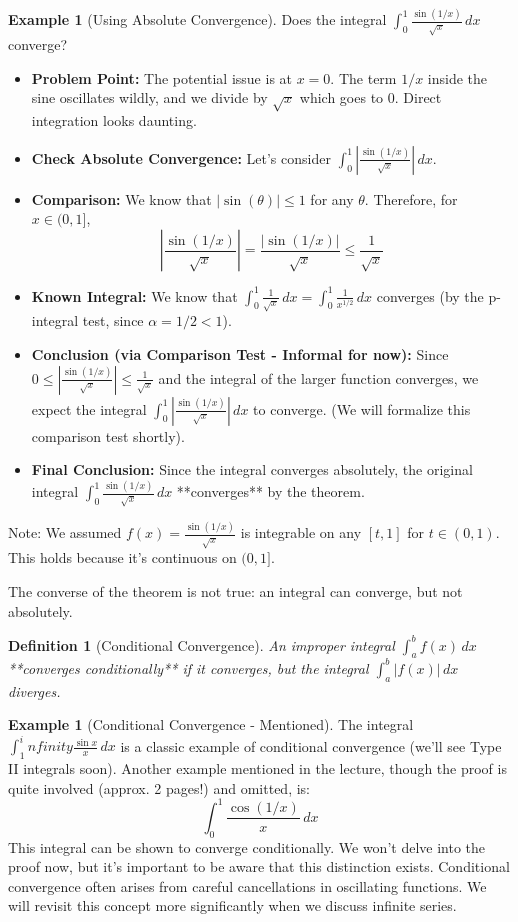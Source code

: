 \documentclass[11pt]{article}
\def\infty{infinity}%
\newtheorem{definition}[theorem]{Definition}
\theoremstyle{definition}
\newtheorem{example}[theorem]{Example}
\newcommand{\dx}{\, dx} %
\begin{document}
\begin{example}[Using Absolute Convergence] \label{ex:sin_sqrtx}
    Does the integral $\int_0^1 \frac{\sin(1/x)}{\sqrt{x}} \dx$ converge?
    \begin{itemize}
        \item \textbf{Problem Point:} The potential issue is at $x=0$. The term $1/x$ inside the sine oscillates wildly, and we divide by $\sqrt{x}$ which goes to 0. Direct integration looks daunting.
        \item \textbf{Check Absolute Convergence:} Let's consider $\int_0^1 \left| \frac{\sin(1/x)}{\sqrt{x}} \right| \dx$.
        \item \textbf{Comparison:} We know that $|\sin(\theta)| \le 1$ for any $\theta$. Therefore, for $x \in (0, 1]$,
          \[
          \left| \frac{\sin(1/x)}{\sqrt{x}} \right| = \frac{|\sin(1/x)|}{\sqrt{x}} \le \frac{1}{\sqrt{x}}
          \]
        \item \textbf{Known Integral:} We know that $\int_0^1 \frac{1}{\sqrt{x}} \dx = \int_0^1 \frac{1}{x^{1/2}} \dx$ converges (by the p-integral test, since $\alpha = 1/2 < 1$).
        \item \textbf{Conclusion (via Comparison Test - Informal for now):} Since $0 \le \left| \frac{\sin(1/x)}{\sqrt{x}} \right| \le \frac{1}{\sqrt{x}}$ and the integral of the larger function converges, we expect the integral $\int_0^1 \left| \frac{\sin(1/x)}{\sqrt{x}} \right| \dx$ to converge. (We will formalize this comparison test shortly).
        \item \textbf{Final Conclusion:} Since the integral converges absolutely, the original integral $\int_0^1 \frac{\sin(1/x)}{\sqrt{x}} \dx$ **converges** by the theorem.
    \end{itemize}
    Note: We assumed $f(x) = \frac{\sin(1/x)}{\sqrt{x}}$ is integrable on any $[t, 1]$ for $t \in (0, 1)$. This holds because it's continuous on $(0, 1]$.
\end{example}

The converse of the theorem is not true: an integral can converge, but not absolutely.

\begin{definition}[Conditional Convergence]
    An improper integral $\int_a^b f(x) \dx$ **converges conditionally** if it converges, but the integral $\int_a^b |f(x)| \dx$ diverges.
\end{definition}

\begin{example}[Conditional Convergence - Mentioned]
    The integral $\int_1^\infty \frac{\sin x}{x} \dx$ is a classic example of conditional convergence (we'll see Type II integrals soon). Another example mentioned in the lecture, though the proof is quite involved (approx. 2 pages!) and omitted, is:
    \[
    \int_0^1 \frac{\cos(1/x)}{x} \dx
    \]
    This integral can be shown to converge conditionally. We won't delve into the proof now, but it's important to be aware that this distinction exists. Conditional convergence often arises from careful cancellations in oscillating functions. We will revisit this concept more significantly when we discuss infinite series.
\end{example}
\end{document}
